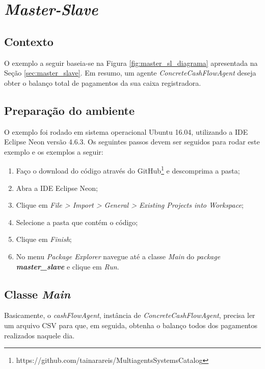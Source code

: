 
\section{\textit{Master-Slave}}\label{appendix:master_slave}

\subsection{Contexto}   

O exemplo a seguir baseia-se na Figura \ref{fig:master_sl_diagrama} apresentada na Seção \ref{sec:master_slave}. Em resumo, um agente \textit{ConcreteCashFlowAgent} deseja obter o balanço total de pagamentos da sua caixa registradora.

\subsection{Preparação do ambiente}\label{subsec:preparacao_ambiente_eclipse}

O exemplo foi rodado em sistema operacional Ubuntu 16.04, utilizando a IDE Eclipse Neon versão 4.6.3. Os seguintes passos devem ser seguidos para rodar este exemplo e os exemplos a seguir:

\begin{enumerate}
    \item Faço o download do código através do GitHub\footnote{https://github.com/tainarareis/MultiagentsSystemsCatalog} e descomprima a pasta;
    \item Abra a IDE Eclipse Neon;
    \item Clique em \textit{File > Import > General > Existing Projects into Workspace};
    \item Selecione a pasta que contém o código;
    \item Clique em \textit{Finish};
    \item No menu \textit{Package Explorer} navegue até a classe \textit{Main} do \textit{package} \textit{\textbf{master_slave}} e clique em \textit{Run}.
\end{enumerate}

\subsection{Classe \textit{Main}}

Basicamente, o \textit{cashFlowAgent}, instância de \textit{ConcreteCashFlowAgent}, precisa ler um arquivo CSV para que, em seguida, obtenha o balanço todos dos pagamentos realizados naquele dia.

